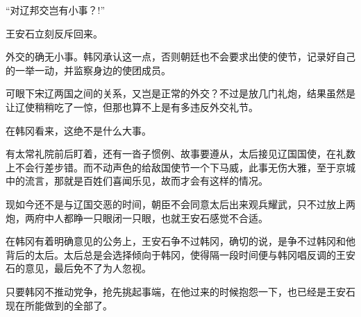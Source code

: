 “对辽邦交岂有小事？!”

王安石立刻反斥回来。

外交的确无小事。韩冈承认这一点，否则朝廷也不会要求出使的使节，记录好自己的一举一动，并监察身边的使团成员。

可眼下宋辽两国之间的关系，又岂是正常的外交？不过是放几门礼炮，结果虽然是让辽使稍稍吃了一惊，但那也算不上是有多违反外交礼节。

在韩冈看来，这绝不是什么大事。

有太常礼院前后盯着，还有一沓子惯例、故事要遵从，太后接见辽国国使，在礼数上不会行差步错。而不动声色的给敌国使节一个下马威，此事无伤大雅，至于京城中的流言，那就是百姓们喜闻乐见，故而才会有这样的情况。

现如今还不是与辽国交恶的时间，朝臣不会同意太后出来观兵耀武，只不过放上两炮，两府中人都睁一只眼闭一只眼，也就王安石感觉不合适。

在韩冈有着明确意见的公务上，王安石争不过韩冈，确切的说，是争不过韩冈和他背后的太后。太后总是会选择倾向于韩冈，使得隔一段时间便与韩冈唱反调的王安石的意见，最后免不了为人忽视。

只要韩冈不推动党争，抢先挑起事端，在他过来的时候抱怨一下，也已经是王安石现在所能做到的全部了。
